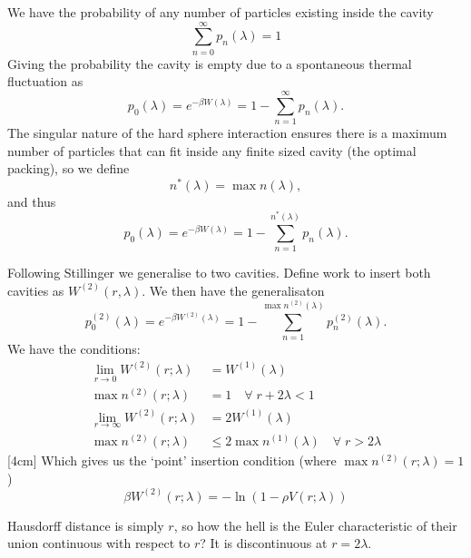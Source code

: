 \documentclass[12pt]{report}
\begin{document}
We have the probability of any number of particles existing inside the cavity
\begin{equation}
  \sum_{n=0}^\infty p_n (\lambda) = 1
\end{equation}
Giving the probability the cavity is empty due to a spontaneous thermal fluctuation
as
\begin{equation}
  p_0 (\lambda) = e^{-\beta W(\lambda)}
  = 1 - \sum_{n=1}^\infty p_n (\lambda).
\end{equation}
The singular nature of the hard sphere interaction ensures there is a maximum number of particles that can fit inside any finite sized cavity (the optimal packing), so we define
\begin{equation}
  n^*(\lambda) = \max{n(\lambda)},
\end{equation}
and thus
\begin{equation}
  p_0 (\lambda) = e^{-\beta W(\lambda)}
  = 1 - \sum_{n=1}^{n^*(\lambda)} p_n (\lambda).
\end{equation}

Following Stillinger we generalise to two cavities.
Define work to insert both cavities as $W^{(2)}(r,\lambda)$.
We then have the generalisaton
\begin{equation}
  p_0^{(2)} (\lambda) = e^{-\beta W^{(2)}(\lambda)}
  = 1 - \sum_{n=1}^{\max{n^{(2)}(\lambda)}} p_n^{(2)} (\lambda).
\end{equation}
We have the conditions:%
\begin{align}
  \lim_{r \to 0} W^{(2)}(r; \lambda) &= W^{(1)}(\lambda) \\
  \max{n^{(2)}(r; \lambda)} &= 1
  \quad \forall \; r + 2\lambda < 1 \\
  \lim_{r \to \infty} W^{(2)}(r; \lambda) &= 2 W^{(1)}(\lambda) \\
  \max{n^{(2)}(r; \lambda)} &\le 2 \max{n^{(1)}(\lambda)}
  \quad \forall \; r > 2\lambda
\end{align}
[4cm]
Which gives us the `point' insertion condition (where $\max{n^{(2)}(r; \lambda)} = 1$)
\begin{equation}
  \beta W^{(2)}(r; \lambda) = -\ln (1 - \rho V(r; \lambda))
\end{equation}

Hausdorff distance is simply $r$, so how the hell is the Euler characteristic of their union continuous with respect to $r$? It is discontinuous at $r = 2\lambda$.
\end{document}
